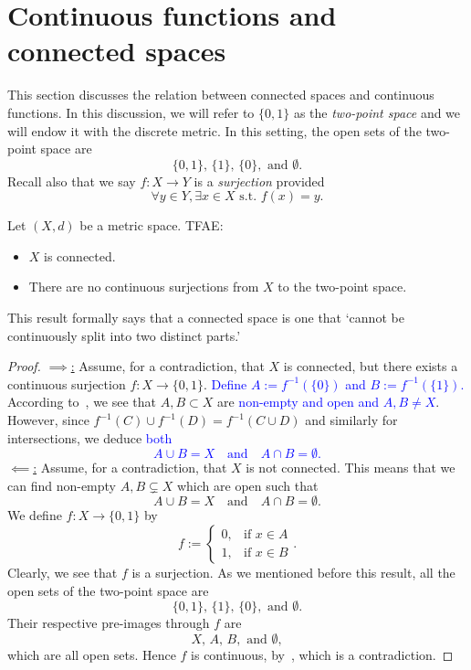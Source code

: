 \section{Continuous functions and connected spaces}
\label{sec:connected_cts}
This section discusses the relation between connected spaces and continuous functions. In this discussion, we will refer to $\{0,1\}$ as the \textit{two-point space} and we will endow it with the discrete metric. In this setting, the open sets of the two-point space are
\[
\{0,1\},\,\{1\},\,\{0\},\text{ and }\emptyset.
\]
Recall also that we say $f:X\to Y$ is a \textit{surjection} provided
\[
\forall y\in Y,\exists x\in X\text{ s.t. }f(x) = y.
\]
\begin{prop}
	\label{prop:connected_two-point}
	Let $(X,d)$ be a metric space. TFAE:
	\begin{itemize}
		\item $X$ is connected.
		\item There are no continuous surjections from $X$ to the two-point space.
	\end{itemize}
\end{prop}
This result formally says that a connected space is one that `cannot be continuously split into two distinct parts.'
\begin{proof}
	\ul{$\implies$:} Assume, for a contradiction, that $X$ is connected, but there exists a continuous surjection $f:X \to \{0,1\}$. \textcolor{blue}{Define $A:= f^{-1}(\{0\})$ and $B:= f^{-1}(\{1\})$.} According to~, we see that $A,B \subset X$ are \textcolor{blue}{non-empty and open and $A,B\neq X$}. However, since $f^{-1}(C)\cup f^{-1}(D) = f^{-1}(C\cup D)$ and similarly for intersections, we deduce \textcolor{blue}{both
	\[
	A \cup B = X\quad\text{and}\quad A\cap B = \emptyset.
	\]
	}
	\ul{$\impliedby$:} Assume, for a contradiction, that $X$ is not connected. This means that we can find non-empty $A,B\subsetneq X$ which are open such that
	\[
	A\cup B = X\quad\text{and}\quad A\cap B = \emptyset.
	\]
	We define $f:X\to \{0,1\}$ by
	\[
	f:=\left\{
	\begin{array}{cc}
		0,	&\text{if }x\in A 	\\
		1, 	&\text{if }x \in B
	\end{array}
	\right..
	\]
	Clearly, we see that $f$ is a surjection. As we mentioned before this result, all the open sets of the two-point space are
	\[
	\{0,1\},\,\{1\},\,\{0\},\text{ and }\emptyset.
	\]
	Their respective pre-images through $f$ are
	\[
	X,\,A,\,B,\text{ and }\emptyset,
	\]
	which are all open sets. Hence $f$ is continuous, by~, which is a contradiction.
\end{proof}

